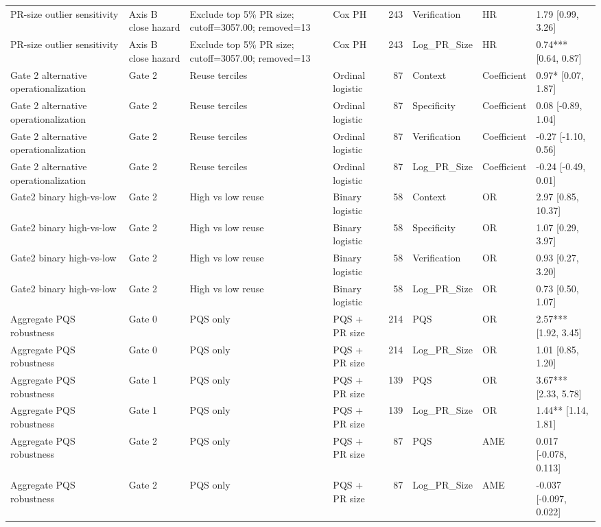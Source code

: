 \begin{table}
\begin{tabular}{llllrlll}
PR-size outlier sensitivity & Axis B close hazard & Exclude top 5\% PR size; cutoff=3057.00; removed=13 & Cox PH & 243 & Verification & HR & 1.79 [0.99, 3.26] \\
PR-size outlier sensitivity & Axis B close hazard & Exclude top 5\% PR size; cutoff=3057.00; removed=13 & Cox PH & 243 & Log\_PR\_Size & HR & 0.74*** [0.64, 0.87] \\
Gate 2 alternative operationalization & Gate 2 & Reuse terciles & Ordinal logistic & 87 & Context & Coefficient & 0.97* [0.07, 1.87] \\
Gate 2 alternative operationalization & Gate 2 & Reuse terciles & Ordinal logistic & 87 & Specificity & Coefficient & 0.08 [-0.89, 1.04] \\
Gate 2 alternative operationalization & Gate 2 & Reuse terciles & Ordinal logistic & 87 & Verification & Coefficient & -0.27 [-1.10, 0.56] \\
Gate 2 alternative operationalization & Gate 2 & Reuse terciles & Ordinal logistic & 87 & Log\_PR\_Size & Coefficient & -0.24 [-0.49, 0.01] \\
Gate2 binary high-vs-low & Gate 2 & High vs low reuse & Binary logistic & 58 & Context & OR & 2.97 [0.85, 10.37] \\
Gate2 binary high-vs-low & Gate 2 & High vs low reuse & Binary logistic & 58 & Specificity & OR & 1.07 [0.29, 3.97] \\
Gate2 binary high-vs-low & Gate 2 & High vs low reuse & Binary logistic & 58 & Verification & OR & 0.93 [0.27, 3.20] \\
Gate2 binary high-vs-low & Gate 2 & High vs low reuse & Binary logistic & 58 & Log\_PR\_Size & OR & 0.73 [0.50, 1.07] \\
Aggregate PQS robustness & Gate 0 & PQS only & PQS + PR size & 214 & PQS & OR & 2.57*** [1.92, 3.45] \\
Aggregate PQS robustness & Gate 0 & PQS only & PQS + PR size & 214 & Log\_PR\_Size & OR & 1.01 [0.85, 1.20] \\
Aggregate PQS robustness & Gate 1 & PQS only & PQS + PR size & 139 & PQS & OR & 3.67*** [2.33, 5.78] \\
Aggregate PQS robustness & Gate 1 & PQS only & PQS + PR size & 139 & Log\_PR\_Size & OR & 1.44** [1.14, 1.81] \\
Aggregate PQS robustness & Gate 2 & PQS only & PQS + PR size & 87 & PQS & AME & 0.017 [-0.078, 0.113] \\
Aggregate PQS robustness & Gate 2 & PQS only & PQS + PR size & 87 & Log\_PR\_Size & AME & -0.037 [-0.097, 0.022] \\

\end{tabular}
\end{table}
